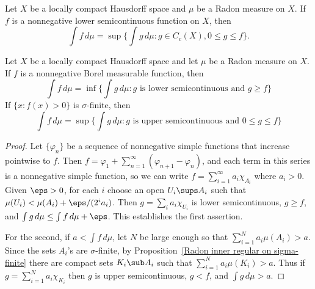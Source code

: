 \begin{corollary}\label{Radon integral of nonnegative LSC by C_c(X)}
Let $X$ be a locally compact Hausdorff space and $\mu$ be a Radon measure on $X$. If $f$ is a nonnegative lower semicontinuous function on $X$, then
\[\int f\,d\mu=\sup\{\int g\,d\mu:g\in C_c(X),0\leq g\leq f\}.\]
\end{corollary}
\begin{proposition}\label{Radon integral Borel measurable by LSC and USC}
Let $X$ be a locally compact Hausdorff space and let $\mu$ be a Radon measure on $X$. If $f$ is a nonnegative Borel measurable function, then
\[\int f\,d\mu=\inf\{\int g\,d\mu:\text{$g$ is lower semicontinuous and $g\geq f$}\}\]
If $\{x:f(x)>0\}$ is $\sigma$-finite, then
\[\int f\,d\mu=\sup\{\int g\,d\mu:\text{$g$ is upper semicontinuous and $0\leq g\leq f$}\}\]
\end{proposition}
\begin{proof}
Let $\{\varphi_n\}$ be a sequence of nonnegative simple functions that increase pointwise to $f$. Then $f=\varphi_1+\sum_{n=1}^{\infty}(\varphi_{n+1}-\varphi_n)$, and each term in this series is a nonnegative simple function, so we can write $f=\sum_{i=1}^{\infty}a_i\chi_{A_i}$ where $a_i>0$. Given $\eps>0$, for each $i$ choose an open $U_i\sups A_i$ such that $\mu(U_i)<\mu(A_i)+\eps/(2^ia_i)$. Then $g=\sum_ia_i\chi_{U_i}$ is lower semicontinuous, $g\geq f$, and $\int g\,d\mu\leq\int f\,d\mu+\eps$. This establishes the first assertion.\par
For the second, if $a<\int f\,d\mu$, let $N$ be large enough so that $\sum_{i=1}^{N}a_i\mu(A_i)>a$. Since the sets $A_i$'s are $\sigma$-finite, by Proposition~\ref{Radon inner regular on sigma-finite} there are compact sets $K_i\sub A_i$ such that $\sum_{i=1}^{N}a_i\mu(K_i)>a$. Thus if $g=\sum_{i=1}^{N}a_i\chi_{K_i}$ then $g$ is upper semicontinuous, $g<f$, and $\int g\,d\mu>a$.
\end{proof}
